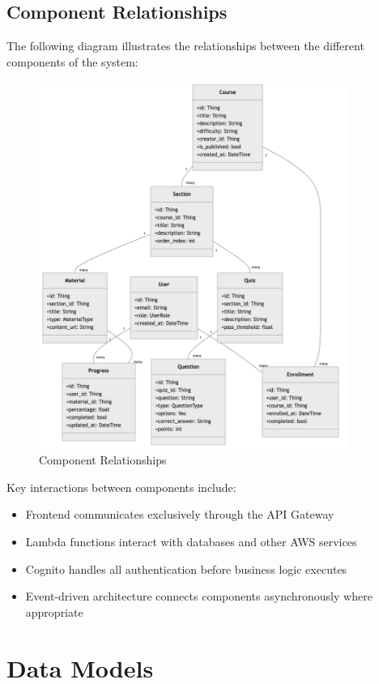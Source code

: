 \documentclass[a4paper, 11pt]{scrreprt}
\begin{document}
\section{Component Relationships}
The following diagram illustrates the relationships between the different components of the system:

\begin{figure}[ht]
    \centering
    \includegraphics[width=0.9\textwidth]{component_relationships.png}
    \caption{Component Relationships}
\end{figure}

Key interactions between components include:
\begin{itemize}
    \item Frontend communicates exclusively through the API Gateway
    \item Lambda functions interact with databases and other AWS services
    \item Cognito handles all authentication before business logic executes
    \item Event-driven architecture connects components asynchronously where appropriate
\end{itemize}

\chapter{Data Models}
\end{document}
